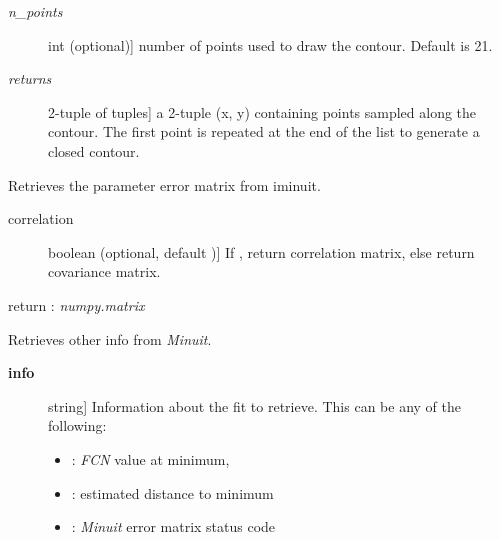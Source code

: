 \documentclass[a4paper,10pt,english]{sphinxmanual}
\begin{document}
\begin{fulllineitems}
\begin{fulllineitems}
\begin{description}
\item[{\emph{n\_points}}] \leavevmode{[}int (optional){]}
number of points used to draw the contour. Default is 21.

\item[{\emph{returns}}] \leavevmode{[}2-tuple of tuples{]}
a 2-tuple (x, y) containing  points sampled
along the contour. The first point is repeated at the end
of the list to generate a closed contour.

\end{description}

\end{fulllineitems}


\begin{fulllineitems}
\label{index:kafe.iminuit_wrapper.IMinuit.get_error_matrix}
Retrieves the parameter error matrix from iminuit.
\begin{description}
\item[{correlation}] \leavevmode{[}boolean (optional, default ){]}
If , return correlation matrix, else return
covariance matrix.

\end{description}

return : \emph{numpy.matrix}

\end{fulllineitems}


\begin{fulllineitems}
\label{index:kafe.iminuit_wrapper.IMinuit.get_fit_info}
Retrieves other info from \emph{Minuit}.
\begin{description}
\item[{\textbf{info}}] \leavevmode{[}string{]}
Information about the fit to retrieve.
This can be any of the following:
\begin{itemize}
\item {} 
: \emph{FCN} value at minimum,

\item {} 
: estimated distance to minimum

\item {} 
: \emph{Minuit} error matrix status code


\end{itemize}
\end{description}
\end{fulllineitems}
\end{fulllineitems}
\end{document}
